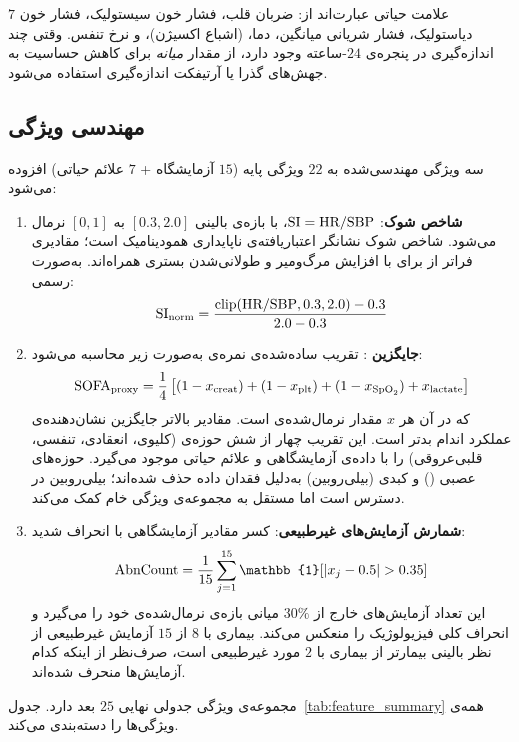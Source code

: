 $7$ علامت حیاتی عبارت‌اند از: ضربان قلب، فشار خون سیستولیک، فشار خون دیاستولیک، فشار شریانی میانگین، دما،  (اشباع اکسیژن)، و نرخ تنفس. وقتی چند اندازه‌گیری در پنجره‌ی $24$-ساعته وجود دارد، از مقدار \emph{میانه} برای کاهش حساسیت به جهش‌های گذرا یا آرتیفکت اندازه‌گیری استفاده می‌شود.

\subsection{مهندسی ویژگی}

سه ویژگی مهندسی‌شده به $22$ ویژگی پایه ($15$ آزمایشگاه + $7$ علائم حیاتی) افزوده می‌شود:
\begin{enumerate}
\item \textbf{شاخص شوک}: $\text{SI} = \text{HR} / \text{SBP}$، با بازه‌ی بالینی $[0.3, 2.0]$ به $[0,1]$ نرمال می‌شود. شاخص شوک نشانگر اعتباریافته‌ی ناپایداری همودینامیک است؛ مقادیری فراتر از \mbox{} برای  با افزایش مرگ‌ومیر و طولانی‌شدن بستری  همراه‌اند. به‌صورت رسمی:
\begin{equation}
\text{SI}_{\text{norm}} = \frac{\text{clip}(\text{HR}/\text{SBP}, 0.3, 2.0) - 0.3}{2.0 - 0.3}
\end{equation}

\item \textbf{جایگزین }: تقریب ساده‌شده‌ی نمره‌ی  به‌صورت زیر محاسبه می‌شود:
\begin{equation}
\text{SOFA}_{\text{proxy}} = \frac{1}{4}\left[(1 - x_{\text{creat}}) + (1 - x_{\text{plt}}) + (1 - x_{\text{SpO}_2}) + x_{\text{lactate}}\right]
\end{equation}
که در آن هر $x$ مقدار نرمال‌شده‌ی  است. مقادیر بالاتر جایگزین نشان‌دهنده‌ی عملکرد اندام بدتر است. این تقریب چهار از شش حوزه‌ی  (کلیوی، انعقادی، تنفسی، قلبی‌عروقی) را با داده‌ی آزمایشگاهی و علائم حیاتی موجود می‌گیرد. حوزه‌های عصبی () و کبدی (بیلی‌روبین) به‌دلیل فقدان داده حذف شده‌اند؛ بیلی‌روبین در دسترس است اما مستقل به مجموعه‌ی ویژگی خام کمک می‌کند.

\item \textbf{شمارش آزمایش‌های غیرطبیعی}: کسر مقادیر آزمایشگاهی با انحراف شدید:
\begin{equation}
\text{\lr{AbnCount}} = \frac{1}{15}\sum_{j=1}^{15} \mathbb{1}[|x_j - 0.5| > 0.35]
\end{equation}
این تعداد آزمایش‌های خارج از $30\%$ میانی بازه‌ی نرمال‌شده‌ی خود را می‌گیرد و انحراف کلی فیزیولوژیک را منعکس می‌کند. بیماری با $8$ از $15$ آزمایش غیرطبیعی از نظر بالینی بیمارتر از بیماری با $2$ مورد غیرطبیعی است، صرف‌نظر از اینکه کدام آزمایش‌ها منحرف شده‌اند.
\end{enumerate}
مجموعه‌ی ویژگی جدولی نهایی $25$ بعد دارد. جدول~\ref{tab:feature_summary} همه‌ی ویژگی‌ها را دسته‌بندی می‌کند.

